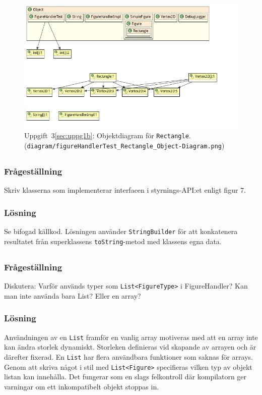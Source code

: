 \begin{figure}[ht]
\centering
\includegraphics[width=\linewidth]{diagram/figureHandlerTest_Rectangle_Object-Diagram.png}
\caption{Uppgift~3\ref{sec:uppg1b}: Objektdiagram för \texttt{Rectangle}.
\\ (\texttt{diagram/figureHandlerTest\_Rectangle\_Object-Diagram.png})}
\label{fig:obj-rect}
\end{figure}

\subsection{}\label{sec:uppg3b}
\subsubsection*{Frågeställning}
Skriv klasserna som implementerar interfacen i styrnings-API:et enligt figur 7.

\subsubsection*{Lösning}
Se bifogad källkod. Lösningen använder \texttt{StringBuilder} för att
konkatenera resultatet från superklassens \texttt{toString}-metod med klassens
egna data.


\subsection{}\label{sec:uppg3c}
\subsubsection*{Frågeställning}
Diskutera: Varför används typer som \texttt{List<FigureType>} i FigureHandler?
Kan man inte använda bara List? Eller en array?


\subsubsection*{Lösning}
Användningen av en \texttt{List} framför en vanlig array motiveras med att en
array inte kan ändra storlek dynamiskt. Storleken definieras vid skapande av
arrayen och är därefter fixerad. En \texttt{List} har flera användbara
funktioner som saknas för arrays. Genom att skriva något i stil med
\texttt{List<Figure>} specifieras vilken typ av objekt listan kan innehålla.
Det fungerar som en slags felkontroll där kompilatorn ger varningar om ett
inkompatibelt objekt stoppas in.


